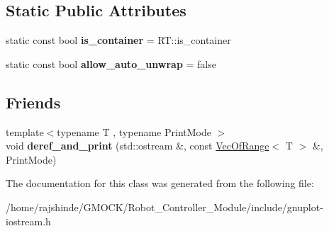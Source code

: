 \subsection*{Static Public Attributes}
\begin{DoxyCompactItemize}
\item 
static const bool {\bfseries is\+\_\+container} = R\+T\+::is\+\_\+container\hypertarget{classgnuplotio_1_1_vec_of_range_a8725d4907d46575dddb7152f1f1d1f66}{}\label{classgnuplotio_1_1_vec_of_range_a8725d4907d46575dddb7152f1f1d1f66}

\item 
static const bool {\bfseries allow\+\_\+auto\+\_\+unwrap} = false\hypertarget{classgnuplotio_1_1_vec_of_range_a19d87e61a7854f9e22d3dd8a94f79500}{}\label{classgnuplotio_1_1_vec_of_range_a19d87e61a7854f9e22d3dd8a94f79500}

\end{DoxyCompactItemize}
\subsection*{Friends}
\begin{DoxyCompactItemize}
\item 
{\footnotesize template$<$typename T , typename Print\+Mode $>$ }\\void {\bfseries deref\+\_\+and\+\_\+print} (std\+::ostream \&, const \hyperlink{classgnuplotio_1_1_vec_of_range}{Vec\+Of\+Range}$<$ T $>$ \&, Print\+Mode)\hypertarget{classgnuplotio_1_1_vec_of_range_adafbfb0122b8e499d1af9c246f4ac288}{}\label{classgnuplotio_1_1_vec_of_range_adafbfb0122b8e499d1af9c246f4ac288}

\end{DoxyCompactItemize}


The documentation for this class was generated from the following file\+:\begin{DoxyCompactItemize}
\item 
/home/rajshinde/\+G\+M\+O\+C\+K/\+Robot\+\_\+\+Controller\+\_\+\+Module/include/gnuplot-\/iostream.\+h\end{DoxyCompactItemize}
